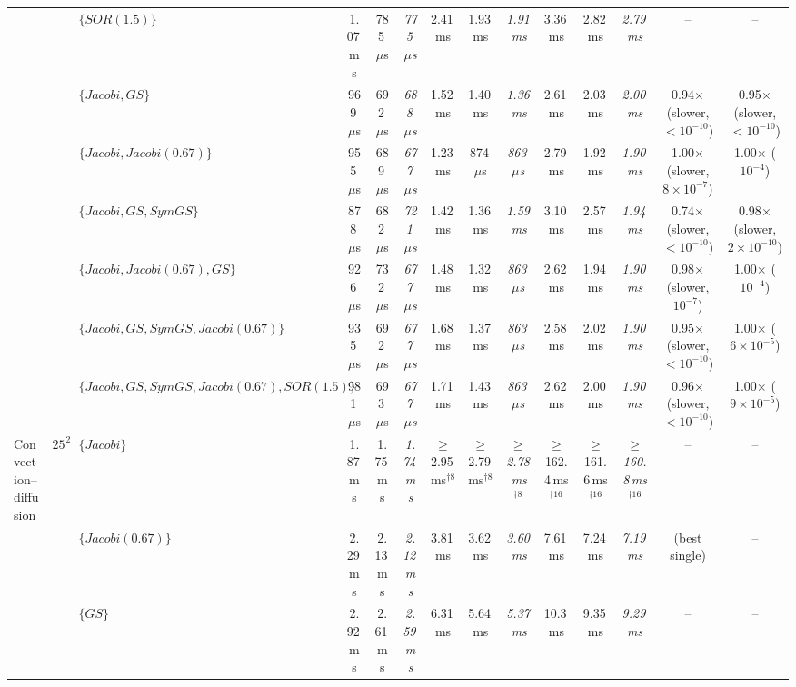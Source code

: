 {\begin{tabular}{lllccccccccccc}
 &  & $\{SOR (1.5)\}$ & 1.07\,ms & 785\,$\mu$s & \textit{775\,$\mu$s} & 2.41\,ms & 1.93\,ms & \textit{1.91\,ms} & 3.36\,ms & 2.82\,ms & \textit{2.79\,ms} & -- & -- \\
 &  & $\{Jacobi, GS\}$ & 969\,$\mu$s & 692\,$\mu$s & \textit{688\,$\mu$s} & 1.52\,ms & 1.40\,ms & \textit{1.36\,ms} & 2.61\,ms & 2.03\,ms & \textit{2.00\,ms} & 0.94$\times$ (slower, $<10^{-10}$) & 0.95$\times$ (slower, $<10^{-10}$) \\
 &  & $\{Jacobi, Jacobi (0.67)\}$ & 955\,$\mu$s & 689\,$\mu$s & \textit{677\,$\mu$s} & 1.23\,ms & 874\,$\mu$s & \textit{863\,$\mu$s} & 2.79\,ms & 1.92\,ms & \textit{1.90\,ms} & 1.00$\times$ (slower, $8\times10^{-7}$) & 1.00$\times$ ($10^{-4}$) \\
 &  & $\{Jacobi, GS, SymGS\}$ & 878\,$\mu$s & 682\,$\mu$s & \textit{721\,$\mu$s} & 1.42\,ms & 1.36\,ms & \textit{1.59\,ms} & 3.10\,ms & 2.57\,ms & \textit{1.94\,ms} & 0.74$\times$ (slower, $<10^{-10}$) & 0.98$\times$ (slower, $2\times10^{-10}$) \\
 &  & $\{Jacobi, Jacobi (0.67), GS\}$ & 926\,$\mu$s & 732\,$\mu$s & \textit{677\,$\mu$s} & 1.48\,ms & 1.32\,ms & \textit{863\,$\mu$s} & 2.62\,ms & 1.94\,ms & \textit{1.90\,ms} & 0.98$\times$ (slower, $10^{-7}$) & 1.00$\times$ ($10^{-4}$) \\
 &  & $\{Jacobi, GS, SymGS, Jacobi (0.67)\}$ & 935\,$\mu$s & 692\,$\mu$s & \textit{677\,$\mu$s} & 1.68\,ms & 1.37\,ms & \textit{863\,$\mu$s} & 2.58\,ms & 2.02\,ms & \textit{1.90\,ms} & 0.95$\times$ (slower, $<10^{-10}$) & 1.00$\times$ ($6\times10^{-5}$) \\
 &  & $\{Jacobi, GS, SymGS, Jacobi (0.67), SOR (1.5)\}$ & 981\,$\mu$s & 693\,$\mu$s & \textit{677\,$\mu$s} & 1.71\,ms & 1.43\,ms & \textit{863\,$\mu$s} & 2.62\,ms & 2.00\,ms & \textit{1.90\,ms} & 0.96$\times$ (slower, $<10^{-10}$) & 1.00$\times$ ($9\times10^{-5}$) \\
\midrule
Convection--diffusion & $256^2$ & $\{Jacobi\}$ & 1.87\,ms & 1.75\,ms & \textit{1.74\,ms} & $\geq$2.95\,ms$^{\dagger 8}$ & $\geq$2.79\,ms$^{\dagger 8}$ & \textit{$\geq$2.78\,ms$^{\dagger 8}$} & $\geq$162.4\,ms$^{\dagger 16}$ & $\geq$161.6\,ms$^{\dagger 16}$ & \textit{$\geq$160.8\,ms$^{\dagger 16}$} & -- & -- \\
 &  & $\{Jacobi (0.67)\}$ & 2.29\,ms & 2.13\,ms & \textit{2.12\,ms} & 3.81\,ms & 3.62\,ms & \textit{3.60\,ms} & 7.61\,ms & 7.24\,ms & \textit{7.19\,ms} & (best single) & -- \\
 &  & $\{GS\}$ & 2.92\,ms & 2.61\,ms & \textit{2.59\,ms} & 6.31\,ms & 5.64\,ms & \textit{5.37\,ms} & 10.3\,ms & 9.35\,ms & \textit{9.29\,ms} & -- & -- \\

\end{tabular}}
